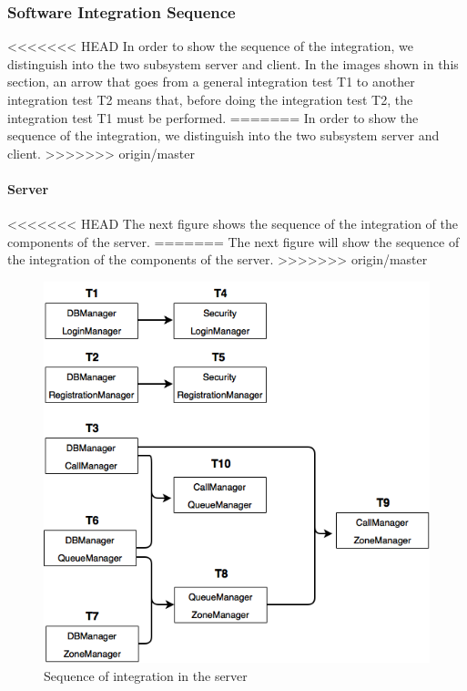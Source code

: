 \subsubsection{Software Integration Sequence}
<<<<<<< HEAD
\label{sectionIntegration}
In order to show the sequence of the integration, we distinguish into the two subsystem server and client.
\newline
In the images shown in this section, an arrow that goes from a general integration test T1 to another integration test T2 means that, before doing the integration test T2, the integration test T1 must be performed.
=======
In order to show the sequence of the integration, we distinguish into the two subsystem server and client.
>>>>>>> origin/master

\newpage
\paragraph{Server}\mbox{}
\newline 
<<<<<<< HEAD
The next figure shows the sequence of the integration of the components of the server.
=======
The next figure will show the sequence of the integration of the components of the server.
>>>>>>> origin/master
\newline

\begin{figure}[H]
    \centering
    \includegraphics[width=13cm]{./Images/System-2.png}
    \caption{Sequence of integration in the server}
    \label{fig: Sequence of integration in the server}
\end{figure}
\newpage

